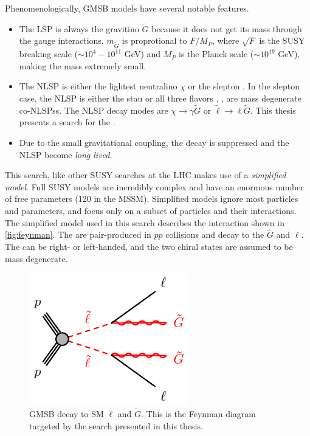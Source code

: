 Phenomenologically, \ac{GMSB} models have several notable features. 
\begin{itemize}
	\item The \ac{LSP} is always the gravitino $\tilde{G}$ because it does not get its mass through the gauge interactions. $m_{\tilde{G}}$ is proprotional to $F/M_P$, where $\sqrt{F}$ is the \ac{SUSY} breaking scale ($\sim 10^4 - 10^{11}$ GeV) and $M_P$ is the Planck scale ($\sim 10^{19}$ GeV), making the mass extremely small.

	\item The \ac{NLSP} is either the lightest neutralino $\chi$ or the slepton \slep. In the slepton case, the \ac{NLSP} is either the stau \stau or all three flavors \selec, \smu, \stau are mass degenerate co-\acp{NLSP}s. The \ac{NLSP} decay modes are $\chi \rightarrow \gamma \tilde{G}$ or $\tilde{\ell} \rightarrow \ell \tilde{G}$. This thesis presents a search for the  \slep. 

	\item Due to the small gravitational coupling, the decay is suppressed and the \ac{NLSP} become \emph{long lived}. 
\end{itemize}

This search, like other \ac{SUSY} searches at the \ac{LHC} makes use of a \emph{simplified model}.
Full \ac{SUSY} models are incredibly complex and have an enormous number of free parameters (120 in the \ac{MSSM}). Simplified models ignore most particles and parameters, and focus only on a subset of particles and their interactions. The simplified model used in this search describes the interaction shown in \autoref{fig:feynman}. The \slep are pair-produced in $pp$ collisions and decay to the $\tilde{G}$ and $\ell$. The \slep can be right- or left-handed, and the two chiral states are assumed to be mass degenerate.

\begin{figure}[!h]
\centering
\includegraphics[width=.4\textwidth]{figures/theory/slsl-llGG-GMSB.pdf}
\caption{\ac{GMSB} \slep decay to \ac{SM} $\ell$ and $\tilde{G}$. This is the Feynman diagram targeted by the search presented in this thesis.}
\label{fig:feynman}
\end{figure}


